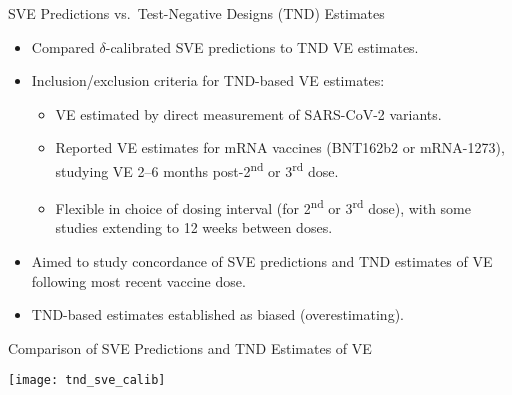 \documentclass{beamer}
\begin{document}

\begin{frame}[c]{SVE Predictions vs.~Test-Negative Designs (TND) Estimates}

\begin{center}
\begin{itemize}
  \itemsep6pt
  \item Compared $\delta$-calibrated SVE predictions to TND VE estimates.
  \item Inclusion/exclusion criteria for TND-based VE estimates\footnotemark:
    \begin{itemize}
      \itemsep2pt
      \item VE estimated by direct measurement of SARS-CoV-2 variants.
      \item Reported VE estimates for mRNA vaccines (BNT162b2 or mRNA-1273),
        studying VE 2--6 months post-2\textsuperscript{nd} or
        3\textsuperscript{rd} dose.
      \item Flexible in choice of dosing interval (for 2\textsuperscript{nd} or
        3\textsuperscript{rd} dose), with some studies extending to 12 weeks
        between doses.
    \end{itemize}
  \item Aimed to study concordance of SVE predictions and TND estimates of VE
    following most recent vaccine dose.
  \item TND-based estimates established as biased (overestimating).
\end{itemize}
\end{center}


\note{
}

\end{frame}


\begin{frame}[c]{Comparison of SVE Predictions and TND Estimates of VE}

\hspace*{-0.5cm}\texttt{[image: tnd\_sve\_calib]}

\note{
}

\end{frame}

\end{document}
